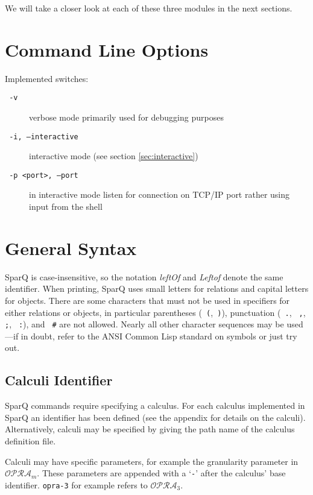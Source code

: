 \documentclass[headsepline]{scrreprt}
\theoremstyle{definition}
\newcommand{\engine}{SparQ}
\newcommand{\opra}{$\mathcal{OPRA}_m$}
\newcommand{\opradrei}{$\mathcal{OPRA}_3$}
\begin{document}
We will take a closer look at each of these three modules in the next sections.


\section{Command Line Options}\label{SEC:cmd-line-options}

Implemented switches:
\begin{description}
	\item[\texttt{ -v}] verbose mode primarily used for debugging purposes
	\item[\texttt{ -i, --interactive}] interactive mode (see section \ref{sec:interactive})
	\item[\texttt{ -p <port>, --port}] in interactive mode listen for connection on TCP/IP port rather using input from the shell
\end{description}


\section{General Syntax}\label{sec:syntax}

\engine{} is case-insensitive, so the notation {\em leftOf} and {\em Leftof} denote the same identifier. When printing, \engine{} uses small letters for relations and capital letters for objects.
There are some characters that must not be used in specifiers for either relations or objects, in particular parentheses (\texttt{ (},\texttt{ )}), punctuation (\texttt{ .}, \texttt{ ,}, \texttt{ ;}, \texttt{ :}), and \texttt{ \#} are not allowed. Nearly all other character sequences may be used---if in doubt, refer to the ANSI Common Lisp standard on symbols or just try out.


\subsection{Calculi Identifier}

\engine{} commands require specifying a calculus. For each calculus implemented in \engine{} an identifier has been defined (see the appendix for details on the calculi). Alternatively, calculi may be specified by giving the path name of the calculus definition file.

Calculi may have specific parameters, for example the granularity parameter in \opra{}. These parameters are appended with a `\verb|-|' after the calculus' base identifier. \verb|opra-3| for example refers to \opradrei{}. \pagebreak[4]
\end{document}
